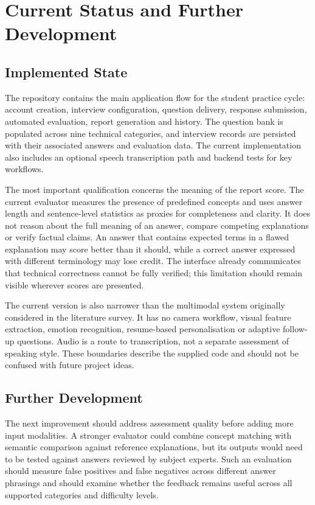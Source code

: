 \documentclass[12pt,a4paper,oneside]{report}
\begin{document}
\chapter{Current Status and Further Development}

\section{Implemented State}
The repository contains the main application flow for the student practice cycle: account creation, interview configuration, question delivery, response submission, automated evaluation, report generation and history. The question bank is populated across nine technical categories, and interview records are persisted with their associated answers and evaluation data. The current implementation also includes an optional speech transcription path and backend tests for key workflows.

The most important qualification concerns the meaning of the report score. The current evaluator measures the presence of predefined concepts and uses answer length and sentence-level statistics as proxies for completeness and clarity. It does not reason about the full meaning of an answer, compare competing explanations or verify factual claims. An answer that contains expected terms in a flawed explanation may score better than it should, while a correct answer expressed with different terminology may lose credit. The interface already communicates that technical correctness cannot be fully verified; this limitation should remain visible wherever scores are presented.

The current version is also narrower than the multimodal system originally considered in the literature survey. It has no camera workflow, visual feature extraction, emotion recognition, resume-based personalisation or adaptive follow-up questions. Audio is a route to transcription, not a separate assessment of speaking style. These boundaries describe the supplied code and should not be confused with future project ideas.

\section{Further Development}
The next improvement should address assessment quality before adding more input modalities. A stronger evaluator could combine concept matching with semantic comparison against reference explanations, but its outputs would need to be tested against answers reviewed by subject experts. Such an evaluation should measure false positives and false negatives across different answer phrasings and should examine whether the feedback remains useful across all supported categories and difficulty levels.
\end{document}
